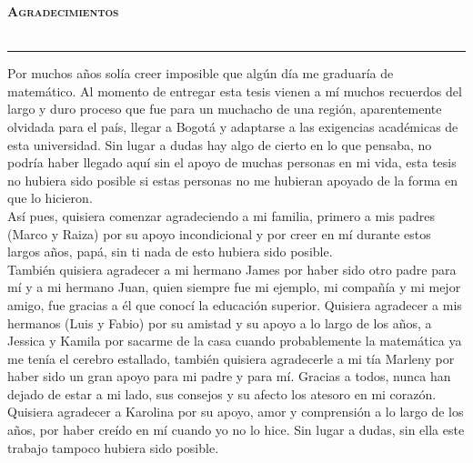 
\newpage
\thispagestyle{empty}
\begin{Huge}
    \bfseries \selectfont \scshape \hfill Agradecimientos \\\\
    \rule[0.5ex]{\linewidth}{1pt}
    \vspace*{1cm}
\end{Huge}

Por muchos años solía creer imposible que algún día me graduaría de matemático. Al momento de entregar esta tesis vienen a mí muchos recuerdos del largo y duro proceso que fue para un muchacho de una región, aparentemente olvidada para el país, llegar a Bogotá y adaptarse a las exigencias académicas de esta universidad. Sin lugar a dudas hay algo  de cierto en lo que pensaba, no podría haber llegado aquí sin el apoyo  de muchas personas en mi vida, esta tesis no hubiera sido posible si estas personas no me hubieran apoyado de la forma en que lo hicieron.\\

Así pues, quisiera comenzar agradeciendo a mi familia, primero a mis padres (Marco y Raiza) por su apoyo incondicional y por creer en mí durante estos largos años, papá, sin ti nada de esto hubiera sido posible.\\

También quisiera agradecer a mi hermano James por haber sido otro padre para mí y a mi hermano Juan, quien siempre fue mi ejemplo, mi compañía y mi mejor amigo, fue gracias a él que conocí la educación superior. Quisiera agradecer a mis hermanos (Luis y Fabio) por su amistad y su apoyo a lo largo de los años, a Jessica y Kamila por sacarme de la casa cuando probablemente la matemática ya me tenía el cerebro estallado, también quisiera agradecerle a mi tía Marleny por haber sido un gran apoyo para mi padre y para mí. Gracias a todos, nunca han dejado de estar a mi lado, sus consejos y su afecto los atesoro en mi corazón.\\
Quisiera agradecer a Karolina por su apoyo, amor y comprensión a lo largo de los años, por haber  creído en mí cuando yo no lo hice. Sin lugar a dudas, sin ella este trabajo tampoco hubiera sido posible.\\

